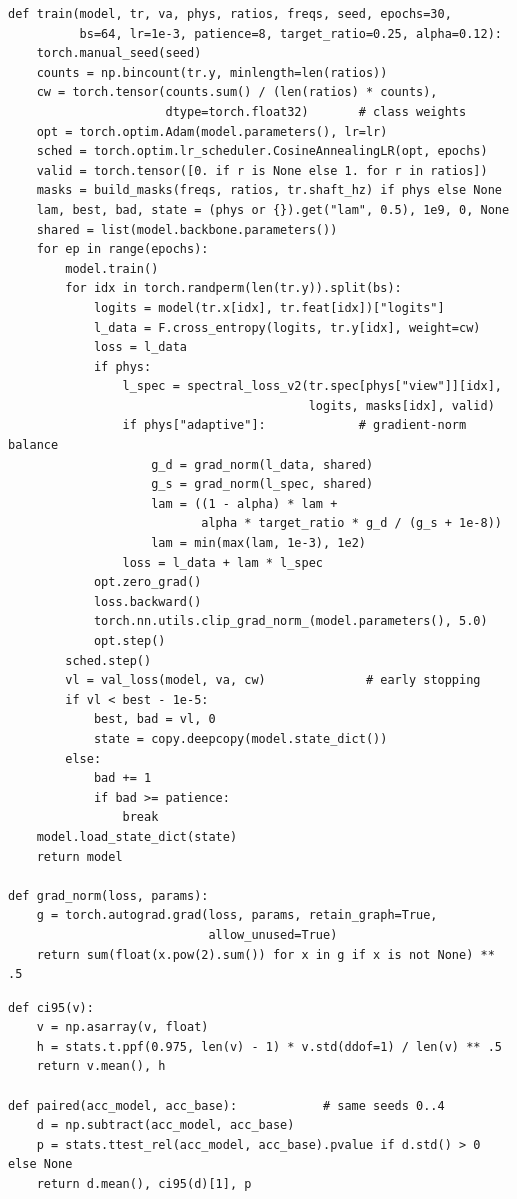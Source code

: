 \documentclass[conference]{IEEEtran}
\begin{document}
\begin{lstlisting}[float=*tp, caption={Training loop shared by all neural models (baseline: \texttt{phys=None}).},label={lst:train}]
def train(model, tr, va, phys, ratios, freqs, seed, epochs=30,
          bs=64, lr=1e-3, patience=8, target_ratio=0.25, alpha=0.12):
    torch.manual_seed(seed)
    counts = np.bincount(tr.y, minlength=len(ratios))
    cw = torch.tensor(counts.sum() / (len(ratios) * counts),
                      dtype=torch.float32)       # class weights
    opt = torch.optim.Adam(model.parameters(), lr=lr)
    sched = torch.optim.lr_scheduler.CosineAnnealingLR(opt, epochs)
    valid = torch.tensor([0. if r is None else 1. for r in ratios])
    masks = build_masks(freqs, ratios, tr.shaft_hz) if phys else None
    lam, best, bad, state = (phys or {}).get("lam", 0.5), 1e9, 0, None
    shared = list(model.backbone.parameters())
    for ep in range(epochs):
        model.train()
        for idx in torch.randperm(len(tr.y)).split(bs):
            logits = model(tr.x[idx], tr.feat[idx])["logits"]
            l_data = F.cross_entropy(logits, tr.y[idx], weight=cw)
            loss = l_data
            if phys:
                l_spec = spectral_loss_v2(tr.spec[phys["view"]][idx],
                                          logits, masks[idx], valid)
                if phys["adaptive"]:             # gradient-norm balance
                    g_d = grad_norm(l_data, shared)
                    g_s = grad_norm(l_spec, shared)
                    lam = ((1 - alpha) * lam +
                           alpha * target_ratio * g_d / (g_s + 1e-8))
                    lam = min(max(lam, 1e-3), 1e2)
                loss = l_data + lam * l_spec
            opt.zero_grad()
            loss.backward()
            torch.nn.utils.clip_grad_norm_(model.parameters(), 5.0)
            opt.step()
        sched.step()
        vl = val_loss(model, va, cw)              # early stopping
        if vl < best - 1e-5:
            best, bad = vl, 0
            state = copy.deepcopy(model.state_dict())
        else:
            bad += 1
            if bad >= patience:
                break
    model.load_state_dict(state)
    return model

def grad_norm(loss, params):
    g = torch.autograd.grad(loss, params, retain_graph=True,
                            allow_unused=True)
    return sum(float(x.pow(2).sum()) for x in g if x is not None) ** .5
\end{lstlisting}

\begin{lstlisting}[float=*tp, caption={Statistics: 95\% CI and paired test against the baseline.},label={lst:stats}]
def ci95(v):
    v = np.asarray(v, float)
    h = stats.t.ppf(0.975, len(v) - 1) * v.std(ddof=1) / len(v) ** .5
    return v.mean(), h

def paired(acc_model, acc_base):            # same seeds 0..4
    d = np.subtract(acc_model, acc_base)
    p = stats.ttest_rel(acc_model, acc_base).pvalue if d.std() > 0 else None
    return d.mean(), ci95(d)[1], p
\end{lstlisting}
\end{document}
